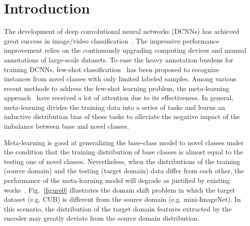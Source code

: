\documentclass[runningheads]{utils/llncs}
\begin{document}
\section{Introduction}
The development of deep convolutional neural networks (DCNNs) has achieved great success in image/video classification~\cite{HeZGLLLWW19,LiW0019,TanL19,WuHLLGD21}. 
The impressive performance improvement relies on the continuously upgrading computing devices and manual annotations of large-scale datasets.
To ease the heavy annotation burdens for training DCNNs, few-shot classification~\cite{lake2015human} has been proposed to recognize instances from novel classes with only limited labeled samples.
Among various recent methods to address the few-shot learning problem, the meta-learning approach~\cite{pmlr-v70-finn17a,FrikhaKKT21,LiuCLL0LH20,NIPS2017_cb8da676,SuiCMQLZ21,Sung_2018_CVPR,NIPS2016_90e13578,WuSLPZ20} have received a lot of attention due to its effectiveness. 
In general, meta-learning divides the training data into a series of tasks and learns an inductive distribution bias of these tasks to alleviate the negative impact of the imbalance between base and novel classes.  



Meta-learning is good at generalizing the base-class model to novel classes under the condition that the training distribution of base classes is almost equal to the testing one of novel classes.
Nevertheless, when the distributions of the training (source domain) and the testing (target domain) data differ from each other, the performance of the meta-learning model will degrade as justified by existing works~\cite{ChenLKWH19,GuoCKCSSRF20}.
Fig.~\ref{figure0} illustrates the domain shift problem in which the target dataset (e.g. CUB) is different from the source domain (e.g. mini-ImageNet).
In this scenario, the distribution of the target domain features extracted by the encoder  may greatly deviate from the source domain distribution.
\end{document}
